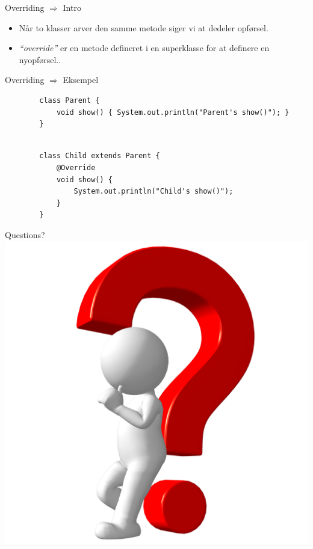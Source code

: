 \documentclass[10pt,aspectratio=1610]{beamer}
\begin{document}
\begin{frame}{Overriding $\Rightarrow$ Intro}
    \begin{itemize}
        \item Når to klasser arver den samme metode siger vi at dedeler opførsel.
        \item \textit{“override”} er en metode defineret i en superklasse for at definere en nyopførsel..
    \end{itemize}
\end{frame}

\begin{frame}[fragile]{Overriding $\Rightarrow$ Eksempel}
    \begin{lstlisting}
        class Parent {
            void show() { System.out.println("Parent's show()"); }
        }
 
    \end{lstlisting}
    \begin{lstlisting}
        class Child extends Parent {
            @Override 
            void show() {
                System.out.println("Child's show()");
            }
        }
    \end{lstlisting}
\end{frame}

\begin{frame}{Questions?}
            \includegraphics[width=\linewidth, height=\paperheight]{images/man-with-question-01.png}
\end{frame}
\end{document}
